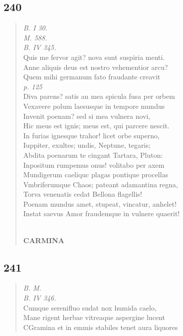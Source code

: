 \documentclass[11pt, a4paper]{report}
\begin{document}
            \subsection*{240}
      \begin{verse}
      \textit{B. I 30.} \\ \textit{M. 588.} \\ \textit{B. IV 345.} \\ Quis me fervor agit? nova sunt suspiria menti. \\ Anne aliquis deus est nostro vehementior arcu? \\ Quem mihi germanum fato fraudante creavit \\ \textit{p. 125} \\ Diva parens? satis an mea spicula fusa per orbem \\ Vexavere polum laesusque in tempore mundus \\ Invenit poenam? sed si mea vulnera novi, \\ Hic meus est ignis; meus est, qui parcere nescit. \\ In furias ignesque trahor! licet orbe superno, \\ Iuppiter, exultes; undis, Neptune, tegaris; \\ Abdita poenarum te cingant Tartara, Pluton: \\ Inpositum rumpemus onus! volitabo per axem \\ Mundigerum caeliquc plagas pontique procellas \\ Vmbriferumque Chaos; pateant adamantina regna, \\ Torva venenatis cedat Bellona flagellis! \\ Poenam mundus amet, stupeat, vincatur, anhelet! \\ Instat saevus Amor fraudemque in vulnere quaerit! \\ 
        ﻿\pagebreak 
     \marginpar{[198]} \begin{center} \textbf{CARMINA} \end{center}
      \end{verse}
  
            \subsection*{241}
      \begin{verse}
      \textit{B. M.} \\ \textit{B. IV 346.} \\ Cumque serenifluo sudat nox humida caelo, \\ Mane rigent herbae vitreaque aspergine lucent \\ CGramina et in emmis stabiles tenet aura liquores \\ 
      \end{verse}
  
\end{document}
